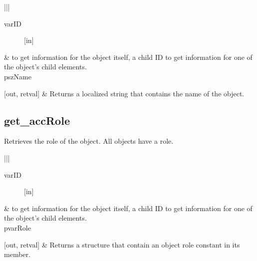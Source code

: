 \documentclass[letterpaper,12pt,english,openany,oneside]{sphinxmanual}
\begin{document}


\begin{savenotes}\sphinxattablestart
\centering
{}\label{\detokenize{MSAA_PDF:section-8}}\nobreak
\begin{tabular}[t]{|*{2}{|}}
\hline
\begin{description}
\item[{varID}] \leavevmode
{[}in{]}

\end{description}
&
 to get information for the object itself, a child ID to get information for one of the object’s child elements.
\\
\hline
pszName

{[}out, retval{]}
&
Returns a localized string that contains the name of the object.
\\
\hline
\end{tabular}
\par
\sphinxattableend\end{savenotes}


\begin{sphinxVerbatim}[commandchars=\\\{\}]
\end{sphinxVerbatim}


\subsection{get\_accRole}
\label{\detokenize{MSAA_PDF:get-accrole}}
Retrieves the role of the object. All objects have a role.

\begin{sphinxVerbatim}[commandchars=\\\{\}]
     
\end{sphinxVerbatim}



\begin{savenotes}\sphinxattablestart
\centering
{}\label{\detokenize{MSAA_PDF:section-9}}\nobreak
\begin{tabular}[t]{|*{2}{|}}
\hline
\begin{description}
\item[{varID}] \leavevmode
{[}in{]}

\end{description}
&
 to get information for the object itself, a child ID to get information for one of the object’s child elements.
\\
\hline
pvarRole

{[}out, retval{]}
&
Returns a structure that contain an object role constant in its  member.
\\
\hline
\end{tabular}
\par
\sphinxattableend\end{savenotes}
\end{document}
